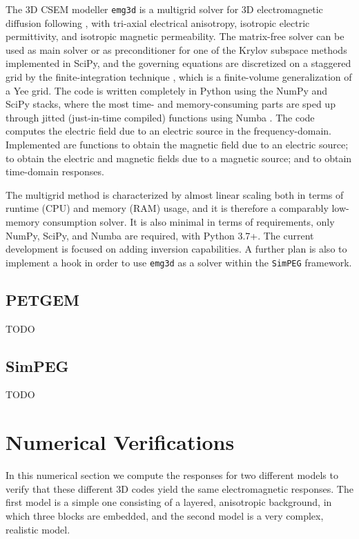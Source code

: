 \documentclass[
    paper,
  ]{geophysics}
\newcommand{\emg}[2]{\texttt{emg#1#2}\xspace}
\newcommand{\simpeg}{\texttt{SimPEG}\xspace}
\begin{document}
The 3D CSEM modeller \emg3d is a multigrid \citep{CMMP.64.Fedorenko} solver for
3D electromagnetic diffusion following \cite{GP.06.Mulder}, with tri-axial
electrical anisotropy, isotropic electric permittivity, and isotropic magnetic
permeability. The matrix-free solver can be used as main solver or as
preconditioner for one of the Krylov subspace methods implemented in SciPy, and
the governing equations are discretized on a staggered grid by the
finite-integration technique \citep{AEU.77.Weiland}, which is a finite-volume
generalization of a Yee grid. The code is written completely in Python using
the NumPy and SciPy stacks, where the most time- and memory-consuming parts are
sped up through jitted (just-in-time compiled) functions using Numba
\citep{LLVM.15.Lam}. The code computes the electric field due to an electric
source in the frequency-domain. Implemented are functions to obtain the
magnetic field due to an electric source; to obtain the electric and magnetic
fields due to a magnetic source; and to obtain time-domain responses.

The multigrid method is characterized by almost linear scaling both in terms of
runtime (CPU) and memory (RAM) usage, and it is therefore a comparably
low-memory consumption solver. It is also minimal in terms of requirements,
only NumPy, SciPy, and Numba are required, with Python 3.7+. The current
development is focused on adding inversion capabilities. A further plan is also
to implement a hook in order to use \emg3d as a solver within the \simpeg
framework.

\subsection{PETGEM}

TODO


\subsection{SimPEG}

TODO


\clearpage  %
\section{Numerical Verifications}

In this numerical section we compute the responses for two different models to
verify that these different 3D codes yield the same electromagnetic responses.
The first model is a simple one consisting of a layered, anisotropic
background, in which three blocks are embedded, and the second model is a very
complex, realistic model.
\end{document}
